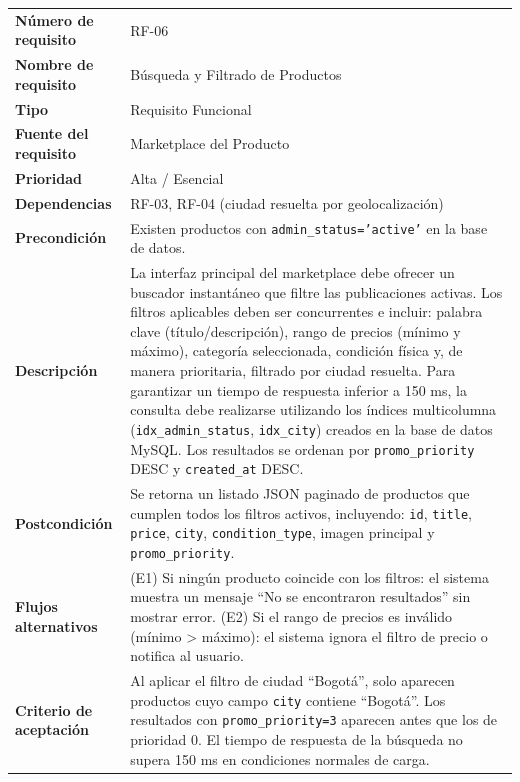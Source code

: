 \documentclass[11pt,a4paper]{report}
\begin{document}
\begin{table}[H]
\centering
\begin{tabularx}{\textwidth}{|l|L|}
\hline
{} \\ \hline
\textbf{Número de requisito} & RF-06 \\ \hline
\textbf{Nombre de requisito} & Búsqueda y Filtrado de Productos \\ \hline
\textbf{Tipo} & Requisito Funcional \\ \hline
\textbf{Fuente del requisito} & Marketplace del Producto \\ \hline
\textbf{Prioridad} & Alta / Esencial \\ \hline
\textbf{Dependencias} & RF-03, RF-04 (ciudad resuelta por geolocalización) \\ \hline
\textbf{Precondición} & Existen productos con \texttt{admin\_status='active'} en la base de datos. \\ \hline
\textbf{Descripción} & La interfaz principal del marketplace debe ofrecer un buscador instantáneo que filtre las publicaciones activas. Los filtros aplicables deben ser concurrentes e incluir: palabra clave (título/descripción), rango de precios (mínimo y máximo), categoría seleccionada, condición física y, de manera prioritaria, filtrado por ciudad resuelta. Para garantizar un tiempo de respuesta inferior a 150 ms, la consulta debe realizarse utilizando los índices multicolumna (\texttt{idx\_admin\_status}, \texttt{idx\_city}) creados en la base de datos MySQL. Los resultados se ordenan por \texttt{promo\_priority} DESC y \texttt{created\_at} DESC. \\ \hline
\textbf{Postcondición} & Se retorna un listado JSON paginado de productos que cumplen todos los filtros activos, incluyendo: \texttt{id}, \texttt{title}, \texttt{price}, \texttt{city}, \texttt{condition\_type}, imagen principal y \texttt{promo\_priority}. \\ \hline
\textbf{Flujos alternativos} & (E1) Si ningún producto coincide con los filtros: el sistema muestra un mensaje ``No se encontraron resultados'' sin mostrar error. (E2) Si el rango de precios es inválido (mínimo > máximo): el sistema ignora el filtro de precio o notifica al usuario. \\ \hline
\textbf{Criterio de aceptación} & Al aplicar el filtro de ciudad ``Bogotá'', solo aparecen productos cuyo campo \texttt{city} contiene ``Bogotá''. Los resultados con \texttt{promo\_priority=3} aparecen antes que los de prioridad 0. El tiempo de respuesta de la búsqueda no supera 150 ms en condiciones normales de carga. \\ \hline
\end{tabularx}
\end{table}
\end{document}
